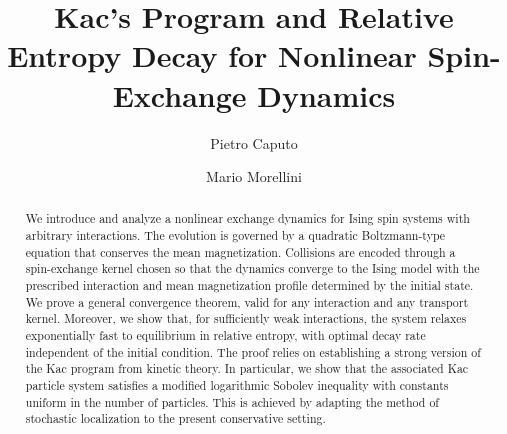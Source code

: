 \documentclass[11pt,reqno]{amsart}
\title[Nonlinear spin-exchange dynamics]{Kac's Program and Relative Entropy Decay for Nonlinear Spin-Exchange Dynamics}
\author{Pietro Caputo}
\author{Mario Morellini}
\numberwithin{equation}{section}
\numberwithin{figure}{section}
\newcommand{\1}{\mathds{1}}
\begin{document}
\begin{abstract}
We introduce and analyze a nonlinear exchange dynamics for Ising spin systems with arbitrary interactions. The evolution is governed by a quadratic Boltzmann-type equation that conserves the mean magnetization. Collisions are encoded through a spin-exchange kernel chosen so that the dynamics converge to the Ising model with the prescribed interaction and mean magnetization profile determined by the initial state. We prove a general convergence theorem, valid for any interaction and any transport kernel. 
Moreover, we show that, for sufficiently weak interactions, the system relaxes exponentially fast to equilibrium in relative entropy, with optimal decay rate independent of the initial condition. The proof relies on establishing a strong version of the Kac program from kinetic theory. In particular, we show that the associated Kac particle system satisfies a modified logarithmic Sobolev inequality with constants uniform in the number of particles. This is achieved by adapting the method of stochastic localization to the present conservative setting.
\end{abstract}

\maketitle
\thispagestyle{empty}


\tableofcontents

\end{document}
